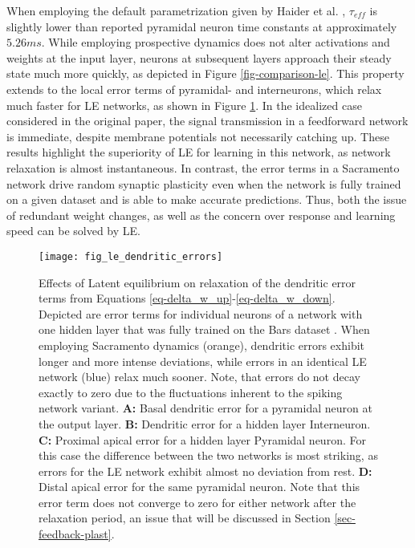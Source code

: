 When employing the default parametrization given by Haider et al. , $\tau_{eff}$ is
slightly lower than reported pyramidal neuron time constants \citep{McCormick1985} at approximately $5.26ms$. While
employing prospective dynamics does not alter activations and weights at the input layer, neurons at subsequent layers
approach their steady state much more quickly, as depicted in Figure \ref{fig-comparison-le}. This property extends to
the local error terms of pyramidal- and interneurons, which relax much faster for LE networks, as shown in Figure
\ref{fig-error-comp-le}. In the idealized case considered in the original paper, the signal transmission in a
feedforward network is immediate, despite membrane potentials not necessarily catching up. These results highlight the
superiority of LE for learning in this network, as network relaxation is almost instantaneous. In contrast, the error
terms in a Sacramento network drive random synaptic plasticity even when the network is fully trained on a given dataset
and is able to make accurate predictions. Thus, both the issue of redundant weight changes, as well as the concern over
response and learning speed can be solved by LE.\newline




\begin{figure}[h]
  \centering
  \texttt{[image: fig\_le\_dendritic\_errors]}
  \caption{Effects of Latent equilibrium on relaxation of the dendritic error terms from Equations
    \ref{eq-delta_w_up}-\ref{eq-delta_w_down}. Depicted are error terms for individual neurons of a network with one
    hidden layer that was fully trained on the Bars dataset . When employing Sacramento dynamics (orange),
    dendritic errors exhibit longer and more intense deviations, while errors in an identical LE network (blue) relax
    much sooner. Note, that errors do not decay exactly to zero due to the fluctuations inherent to the spiking network
    variant. \textbf{A:} Basal dendritic error for a pyramidal neuron at the output layer. \textbf{B:} Dendritic error
    for a hidden layer Interneuron. \textbf{C:} Proximal apical error for a hidden layer Pyramidal neuron. For this case
    the difference between the two networks is most striking, as errors for the LE network exhibit almost no deviation
    from rest. \textbf{D:} Distal apical error for the same pyramidal neuron. Note that this error term does not
    converge to zero for either network after the relaxation period, an issue that will be discussed in Section
    \ref{sec-feedback-plast}.}
  \label{fig-error-comp-le}
\end{figure}

